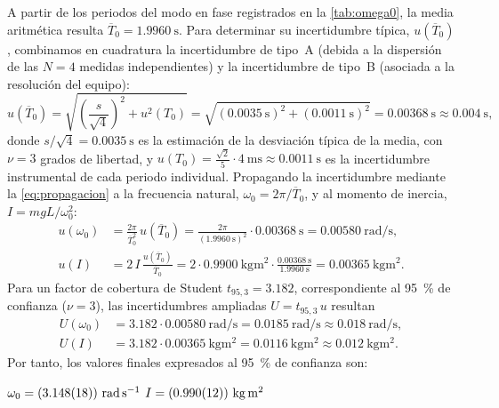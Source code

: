 \documentclass[a4paper,11pt]{amsart}
\numberwithin{equation}{section}
\newcommand{\wz}{\omega_0}                    %
\newcommand{\mean}[1]{\overline{#1}}
\theoremstyle{cienplano}
\theoremstyle{ciendef}
\theoremstyle{cienobs}
\begin{document}
A partir de los periodos del modo en fase registrados en la
\cref{tab:omega0}, la media aritmética resulta
$\mean{T}_0=\SI{1,9960}{\second}$. Para determinar su incertidumbre típica,
$u(\mean{T}_0)$, combinamos en cuadratura la incertidumbre de tipo~A (debida a
la dispersión de las $N=4$ medidas independientes) y la incertidumbre de
tipo~B (asociada a la resolución del equipo):
\begin{equation}\label{eq:uT0valor}
  u(\mean{T}_0)=\sqrt{\left(\frac{s}{\sqrt{4}}\right)^{\!2}+u^{2}(T_0)}
  =\sqrt{(\SI{0,0035}{\second})^{2}+(\SI{0,0011}{\second})^{2}}
  =\SI{0,00368}{\second}\approx\SI{0,004}{\second},
\end{equation}
donde $s/\sqrt{4}=\SI{0,0035}{\second}$ es la estimación de la desviación
típica de la media, con $\nu=3$ grados de libertad, y
$u(T_0)=\frac{\sqrt{2}}{5}\cdot\SI{4}{\milli\second}\approx\SI{0,0011}{\second}$
es la incertidumbre instrumental de cada periodo individual. Propagando la
incertidumbre mediante la \cref{eq:propagacion} a la frecuencia natural,
$\wz=2\pi/\mean{T}_0$, y al momento de inercia, $I=mgL/\wz^{2}$:
\begin{align}
  u(\wz)&=\frac{2\pi}{\mean{T}_0^{2}}\,u(\mean{T}_0)
         =\frac{2\pi}{(\SI{1,9960}{\second})^{2}}\cdot\SI{0,00368}{\second}
         =\SI{0,00580}{\radian\per\second},\label{eq:uw0valor}\\
  u(I)&=2\,I\,\frac{u(\mean{T}_0)}{\mean{T}_0}
       =2\cdot\SI{0,9900}{\kilogram\meter\squared}\cdot\frac{\SI{0,00368}{\second}}{\SI{1,9960}{\second}}
       =\SI{0,00365}{\kilogram\meter\squared}.\label{eq:uIvalor}
\end{align}
Para un factor de cobertura de Student $t_{95,3}=\num{3,182}$,
correspondiente al \SI{95}{\percent} de confianza ($\nu=3$), las
incertidumbres ampliadas $U=t_{95,3}\,u$ resultan
\begin{align*}
  U(\wz)&=\num{3,182}\cdot\SI{0,00580}{\radian\per\second}
         =\SI{0,0185}{\radian\per\second}\approx\SI{0,018}{\radian\per\second},\\
  U(I)&=\num{3,182}\cdot\SI{0,00365}{\kilogram\meter\squared}
       =\SI{0,0116}{\kilogram\meter\squared}\approx\SI{0,012}{\kilogram\meter\squared}.
\end{align*}
Por tanto, los valores finales expresados al \SI{95}{\percent} de confianza
son:

\begin{destacado}[Cuestión 1]
$\wz=(\valWceroU)\ \si{\radian\per\second}$
\quad\textperiodcentered\quad
$I=(\valIU)\ \si{\kilogram\meter\squared}$
\end{destacado}
\end{document}
